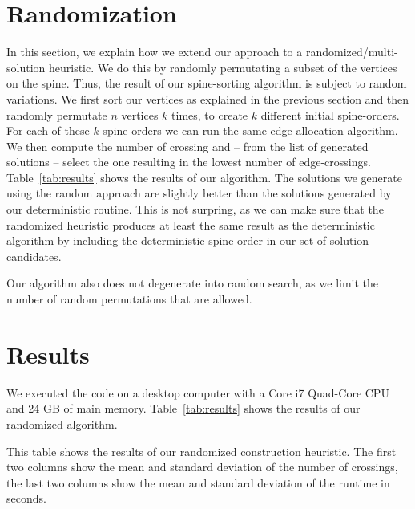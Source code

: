 \documentclass{scrartcl}
\begin{document}
\section{Randomization}
In this section, we explain how we extend our approach to a
randomized/multi-solution heuristic. We do this by randomly
permutating a subset of the vertices on the spine. Thus, the result of
our spine-sorting algorithm is subject to random variations. We first
sort our vertices as explained in the previous section and then
randomly permutate $n$ vertices $k$ times, to create $k$ different
initial spine-orders. For each of these $k$ spine-orders we can run
the same edge-allocation algorithm. We then compute the number of
crossing and -- from the list of generated solutions -- select the one
resulting in the lowest number of
edge-crossings. Table~\ref{tab:results} shows the results of our
algorithm. The solutions we generate using the random approach are
slightly better than the solutions generated by our deterministic
routine. This is not surpring, as we can make sure that the randomized
heuristic produces at least the same result as the deterministic
algorithm by including the deterministic spine-order in our set of
solution candidates.

Our algorithm also does not degenerate into random search, as we limit
the number of random permutations that are allowed.



\section{Results}
We executed the code on a desktop computer with a Core i7 Quad-Core
CPU and 24 GB of main memory. Table~\ref{tab:results} shows the
results of our randomized algorithm.

\begin{table}[h]

\centering

\caption{This table shows the results of our randomized construction heuristic. The first two
columns show the mean and standard deviation of the number of crossings, the last two columns
show the mean and standard deviation of the runtime in seconds.}
\label{tab:results}
\end{table}
\end{document}
